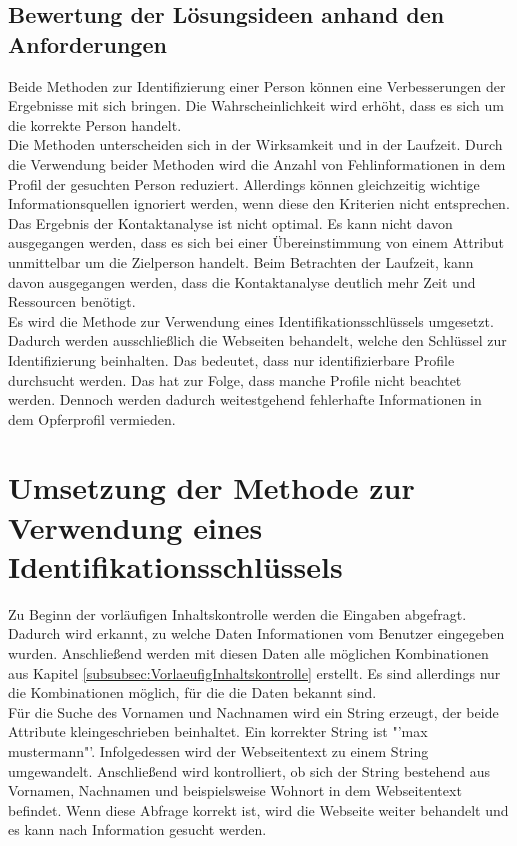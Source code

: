 	\subsection{Bewertung der Lösungsideen anhand den Anforderungen}
	Beide Methoden zur Identifizierung einer Person können eine Verbesserungen der Ergebnisse mit sich bringen. Die Wahrscheinlichkeit wird erhöht, dass es sich um die korrekte Person handelt. \\
	Die Methoden unterscheiden sich in der Wirksamkeit und in der Laufzeit. Durch die Verwendung beider Methoden wird die Anzahl von Fehlinformationen in dem Profil der gesuchten Person reduziert. Allerdings können gleichzeitig wichtige Informationsquellen ignoriert werden, wenn diese den Kriterien nicht entsprechen.\\
	Das Ergebnis der Kontaktanalyse ist nicht optimal. Es kann nicht davon ausgegangen werden, dass es sich bei einer Übereinstimmung von einem  Attribut unmittelbar um die Zielperson handelt. Beim Betrachten der Laufzeit,  kann davon ausgegangen werden, dass die Kontaktanalyse deutlich mehr Zeit und Ressourcen benötigt.\\
	Es wird die Methode zur Verwendung eines Identifikationsschlüssels umgesetzt. Dadurch werden ausschließlich die Webseiten behandelt, welche den Schlüssel zur Identifizierung beinhalten. Das bedeutet, dass nur identifizierbare Profile durchsucht werden. Das hat zur Folge, dass manche Profile nicht beachtet werden. Dennoch werden dadurch weitestgehend fehlerhafte Informationen in dem Opferprofil vermieden.


\section{Umsetzung der Methode zur Verwendung eines Identifikationsschlüssels}
Zu Beginn der vorläufigen Inhaltskontrolle werden die Eingaben abgefragt. Dadurch wird erkannt, zu welche Daten Informationen vom Benutzer eingegeben wurden. Anschließend werden mit diesen Daten alle möglichen Kombinationen aus Kapitel \ref{subsubsec:VorlaeufigInhaltskontrolle} erstellt. Es sind allerdings nur die Kombinationen möglich, für die die Daten bekannt sind.\\
Für die Suche des Vornamen und Nachnamen wird ein String erzeugt, der beide Attribute kleingeschrieben beinhaltet. Ein korrekter String ist "'max mustermann"'. Infolgedessen wird der Webseitentext zu einem String umgewandelt. Anschließend wird kontrolliert, ob sich der String bestehend aus Vornamen, Nachnamen und beispielsweise Wohnort in dem Webseitentext befindet. Wenn diese Abfrage korrekt ist, wird die Webseite weiter behandelt und es kann nach Information gesucht werden.

